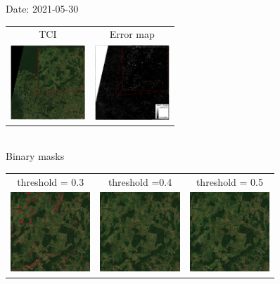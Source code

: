 \documentclass{beamer}
\begin{document}
\begin{frame}{Date: 2021-05-30}
    \centering
        \begin{tabular}{cc}
        TCI & Error map\\
        \includegraphics[width=2.8cm]{Figures/v3/20210530/TCI/tci_zoom1.pdf}
        &
        \includegraphics[width=2.8cm]{Figures/v3/20210530/error_map/error_zoom1.pdf}
    \end{tabular}
    \\
   \centering
    Binary masks
        \begin{tabular}{ccc}
            threshold = 0.3  & threshold =0.4 &  threshold = 0.5 \\
        \includegraphics[width=3cm]{Figures/v3/20210530/umbral_03/zoom1.png}
        &
        \includegraphics[width=3cm]{Figures/v3/20210530/umbral_04/zoom1.png}
        &
        \includegraphics[width=3cm]{Figures/v3/20210530/umbral_05/zoom1.png}
        \end{tabular}
\end{frame}
\end{document}
